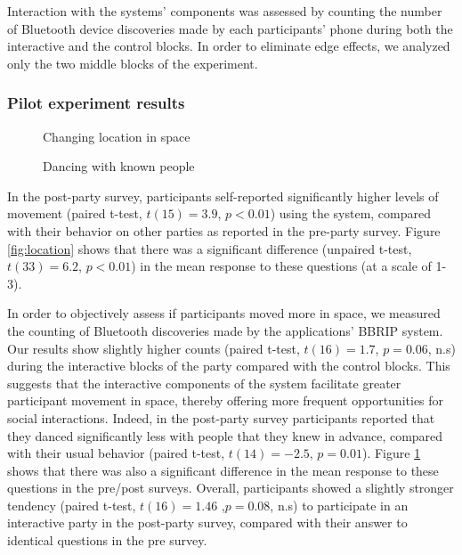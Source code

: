 \documentclass[a4paper,11pt]{article}
\begin{document}
{Interaction with the systems' components was assessed by counting the number of Bluetooth device discoveries made by each participants' phone during both the interactive and the control blocks.
In order to eliminate edge effects, we analyzed only the two middle blocks of the experiment.

\subsubsection{Pilot experiment results}

\begin{figure}[!htb]
	\def\svgwidth{0.95\columnwidth}
  	
	\caption{Changing location in space}\label{fig:location}
\endminipage\hfill
{}
	\def\svgwidth{0.95\columnwidth}
	
	\caption{Dancing with known people}\label{fig:known}
\endminipage\hfill
\end{figure}

In the post-party survey, participants self-reported significantly higher levels of movement (paired t-test, $t(15)=3.9$, $p<0.01$) using the system, compared with their behavior on other parties as reported in the pre-party survey.
Figure \ref{fig:location} shows that there was a significant difference (unpaired t-test, $t(33)=6.2$, $p<0.01$) in the mean response to these questions (at a scale of 1-3).

In order to objectively assess if participants moved more in space, we measured the counting of Bluetooth discoveries made by the applications' BBRIP system.
Our results show slightly higher counts (paired t-test, $t(16)=1.7$, $p=0.06$, n.s) during the interactive blocks of the party compared with the control blocks. This suggests that the interactive components of the system facilitate greater participant movement in space, thereby offering more frequent opportunities for social interactions.
Indeed, in the post-party survey participants reported that they danced significantly less with people that they knew in advance, compared with their usual behavior (paired t-test, $t(14)=-2.5$, $p=0.01$).
Figure \ref{fig:known} shows that there was also a significant difference in the mean response to these questions in the pre/post surveys.
Overall, participants showed a slightly stronger tendency (paired t-test, $t(16)=1.46$ ,$p=0.08$, n.s) to participate in an interactive party in the post-party survey, compared with their answer to identical questions in the pre survey.

}
\end{document}
